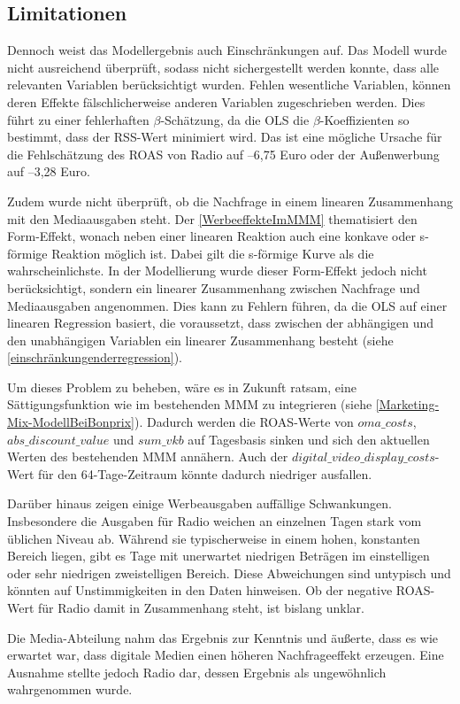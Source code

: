 \subsection{Limitationen}
\label{limitationen}
Dennoch weist das Modellergebnis auch Einschränkungen auf. Das Modell wurde nicht ausreichend überprüft, sodass nicht sichergestellt werden konnte, dass alle relevanten Variablen berücksichtigt wurden. Fehlen wesentliche Variablen, können deren Effekte fälschlicherweise anderen Variablen zugeschrieben werden. Dies führt zu einer fehlerhaften $\beta$-Schätzung, da die \ac{OLS} die $\beta$-Koeffizienten so bestimmt, dass der \ac{RSS}-Wert minimiert wird. Das ist eine mögliche Ursache für die Fehlschätzung des \ac{ROAS} von Radio auf –6,75 Euro oder der Außenwerbung auf –3,28 Euro. \par
Zudem wurde nicht überprüft, ob die Nachfrage in einem linearen Zusammenhang mit den Mediaausgaben steht. Der \autoref{WerbeeffekteImMMM} thematisiert den Form-Effekt, wonach neben einer linearen Reaktion auch eine konkave oder s-förmige Reaktion möglich ist. Dabei gilt die s-förmige Kurve als die wahrscheinlichste. In der Modellierung wurde dieser Form-Effekt jedoch nicht berücksichtigt, sondern ein linearer Zusammenhang zwischen Nachfrage und Mediaausgaben angenommen. Dies kann zu Fehlern führen, da die \ac{OLS} auf einer linearen Regression basiert, die voraussetzt, dass zwischen der abhängigen und den unabhängigen Variablen ein linearer Zusammenhang besteht (siehe \autoref{einschränkungenderregression}). \par
Um dieses Problem zu beheben, wäre es in Zukunft ratsam, eine Sättigungsfunktion wie im bestehenden \ac{MMM} zu integrieren (siehe \autoref{Marketing-Mix-ModellBeiBonprix}). Dadurch werden die \ac{ROAS}-Werte von \(oma\_costs\), \(abs\_discount\_value\) und \(sum\_vkb\) auf Tagesbasis sinken und sich den aktuellen Werten des bestehenden \ac{MMM} annähern. Auch der \(digital\_video\_display\_costs\)-Wert für den 64-Tage-Zeitraum könnte dadurch niedriger ausfallen. \par
Darüber hinaus zeigen einige Werbeausgaben auffällige Schwankungen. Insbesondere die Ausgaben für Radio weichen an einzelnen Tagen stark vom üblichen Niveau ab. Während sie typischerweise in einem hohen, konstanten Bereich liegen, gibt es Tage mit unerwartet niedrigen Beträgen im einstelligen oder sehr niedrigen zweistelligen Bereich. Diese Abweichungen sind untypisch und könnten auf Unstimmigkeiten in den Daten hinweisen. Ob der negative \ac{ROAS}-Wert für Radio damit in Zusammenhang steht, ist bislang unklar. \par
Die Media-Abteilung nahm das Ergebnis zur Kenntnis und äußerte, dass es wie erwartet war, dass digitale Medien einen höheren Nachfrageeffekt erzeugen. Eine Ausnahme stellte jedoch Radio dar, dessen Ergebnis als ungewöhnlich wahrgenommen wurde.
\newpage
